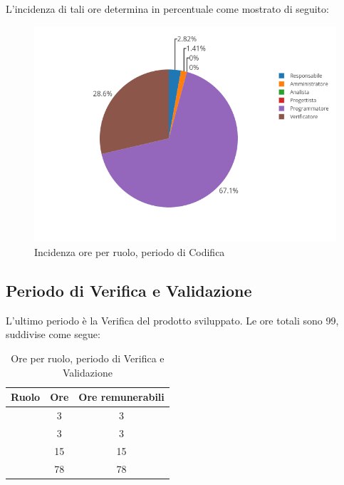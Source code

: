 L'incidenza di tali ore determina in percentuale come mostrato di seguito:
\begin{figure}[H]
	\centering
	\includegraphics[scale=0.6]{img/Codifica.png}
	\caption{Incidenza ore per ruolo, periodo di Codifica}
\end{figure}

\subsection{Periodo di Verifica e Validazione}
L'ultimo periodo è la Verifica del prodotto sviluppato. Le ore totali sono 99, suddivise come segue:

\begin{table}[H]
	\begin{center}
		\begin{tabular}{|c|c|c|}
			\hline
			\textbf{Ruolo}	& \textbf{Ore}	& \textbf{Ore remunerabili} \\
			\hline
			\Res	&	3  &	3	\\
			\hline
			\Amm	&	3  &	3	\\
			\hline
			\Prog   &	15  &	15	\\
			\hline
			\Ver	&	78	&	78	\\
			\hline
		\end{tabular}
	\end{center}
	\caption{Ore per ruolo, periodo di Verifica e Validazione}
\end{table}

